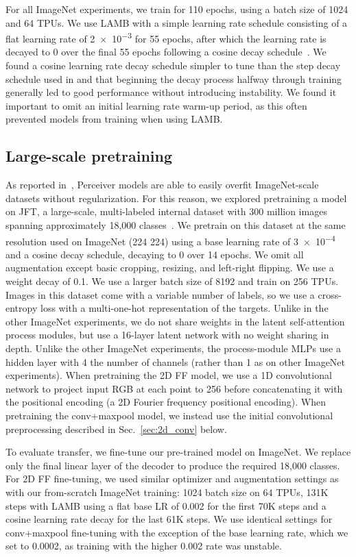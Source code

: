 \documentclass{article} \usepackage{iclr2022_conference,times}
\begin{document}
For all ImageNet experiments, we train for 110 epochs, using a batch size of 1024 and 64 TPUs. We use LAMB with a simple learning rate schedule consisting of a flat learning rate of \num{2e-3} for 55 epochs, after which the learning rate is decayed to 0 over the final 55 epochs following a cosine decay schedule~\citep{loshchilov2017sgdr}. We found a cosine learning rate decay schedule simpler to tune than the step decay schedule used in \cite{jaegle2021perceiver} and that beginning the decay process halfway through training generally led to good performance without introducing instability. We found it important to omit an initial learning rate warm-up period, as this often prevented models from training when using LAMB.

\subsection{Large-scale pretraining}

As reported in~\cite{jaegle2021perceiver}, Perceiver models are able to easily overfit ImageNet-scale datasets without regularization. For this reason, we explored pretraining a model on JFT, a large-scale, multi-labeled internal dataset with 300 million images spanning approximately 18,000 classes~\citep{sun2017revisiting}. We pretrain on this dataset at the same resolution used on ImageNet (224  224) using a base learning rate of \num{3e-4} and a cosine decay schedule, decaying to 0 over 14 epochs. We omit all augmentation except basic cropping, resizing, and left-right flipping. We use a weight decay of 0.1. We use a larger batch size of 8192 and train on 256 TPUs. Images in this dataset come with a variable number of labels, so we use a cross-entropy loss with a multi-one-hot representation of the targets. Unlike in the other ImageNet experiments, we do not share weights in the latent self-attention process modules, but use a 16-layer latent network with no weight sharing in depth. Unlike the other ImageNet experiments, the process-module MLPs use a hidden layer with 4 the number of channels (rather than 1 as on other ImageNet experiments). When pretraining the 2D FF model, we use a 1D convolutional network to project input RGB at each point to 256 before concatenating it with the positional encoding (a 2D Fourier frequency positional encoding). When pretraining the conv+maxpool model, we instead use the initial convolutional preprocessing described in Sec.~\ref{sec:2d_conv} below.

To evaluate transfer, we fine-tune our pre-trained model on ImageNet. We replace only the final linear layer of the decoder to produce the required 18,000 classes. For 2D FF fine-tuning, we used similar optimizer and augmentation settings as with our from-scratch ImageNet training: 1024 batch size on 64 TPUs, 131K steps with LAMB using a flat base LR of 0.002 for the first 70K steps and a cosine learning rate decay for the last 61K steps. We use identical settings for conv+maxpool fine-tuning with the exception of the base learning rate, which we set to 0.0002, as training with the higher 0.002 rate was unstable. 
\end{document}
